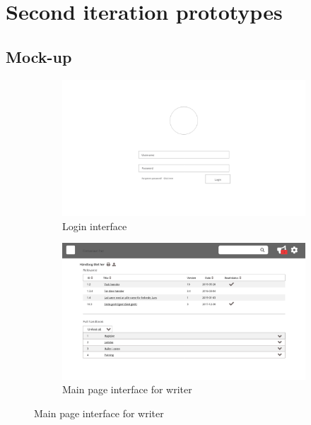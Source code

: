 \chapter{Second iteration prototypes}\label{chap:2-Prototypes}
\section{Mock-up}\label{sec:Mock}

\begin{figure}[H]
	\centering
	\begin{subfigure}[b]{0.48\textwidth}
		\includegraphics[width=\textwidth]{billeder/iteration2Prototyper/Page_1.jpg}
		\caption{Login interface}
		\label{fig:4-Login}
	\end{subfigure}
	\quad
	\begin{subfigure}[b]{0.48\textwidth}
		\includegraphics[width=\textwidth]{billeder/iteration2Prototyper/Page_2.jpg}
		\caption{Main page interface for writer}
		\label{fig:4-Main}
	\end{subfigure}
\end{figure}
